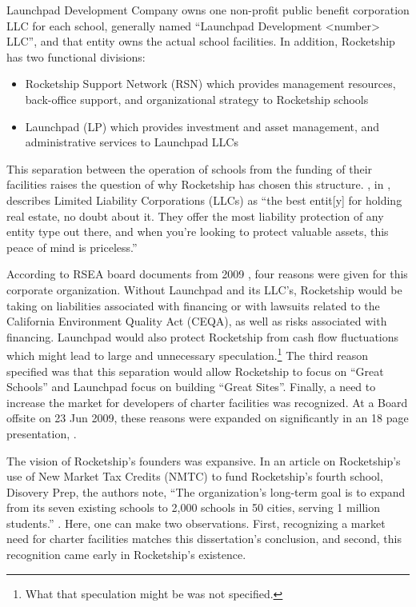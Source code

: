  Launchpad Development Company owns one non-profit public benefit corporation LLC for each school, generally named ``Launchpad Development <number> LLC'', and that entity owns the actual school facilities. In addition, Rocketship has two functional divisions:
\begin{itemize}
  \item Rocketship Support Network (RSN) which provides management resources, back-office support, and organizational strategy to Rocketship schools
  \item Launchpad (LP) which provides investment and asset management, and administrative services to Launchpad LLCs
\end{itemize}

This separation between the operation of schools from the funding of their facilities raises the question of why Rocketship has chosen this structure. \citeauthor{Reuting2023}, in \textcite{Reuting2023}, describes Limited Liability Corporations (LLCs) as ``the best entit[y] for holding real estate, no doubt about it. They offer the most liability protection of any entity type out there, and when you're looking to protect valuable assets, this peace of mind is priceless.''

According to RSEA board documents from 2009 \parencite[12–13]{RSED2009c}, four reasons were given for this corporate organization. Without Launchpad and its LLC's, Rocketship would be taking on liabilities associated with financing or with lawsuits related to the California Environment Quality Act (CEQA), as well as risks associated with financing. Launchpad would also protect Rocketship from cash flow fluctuations which might lead to large and unnecessary speculation.\footnote{What that speculation might be was not specified.} The third reason specified was that this separation would allow Rocketship to focus on ``Great Schools'' and Launchpad focus on building ``Great Sites''. Finally, a need to increase the market for developers of charter facilities was recognized. At a Board offsite on 23 Jun 2009, these reasons were expanded on significantly in an 18 page presentation, \textcite{RSED2009b}.

The vision of Rocketship's founders was expansive. In an article on Rocketship's use of New Market Tax Credits (NMTC) to fund Rocketship's fourth school, Disovery Prep, the authors note, ``The organization’s long-term goal is to expand from its seven existing schools to 2,000 schools in 50 cities, serving 1 million students.'' \parencite[3]{Carlisle.Kovalkoski2012}. Here, one can make two observations. First, recognizing a market need for charter facilities matches this dissertation's conclusion, and second, this recognition came early in Rocketship's existence. 

